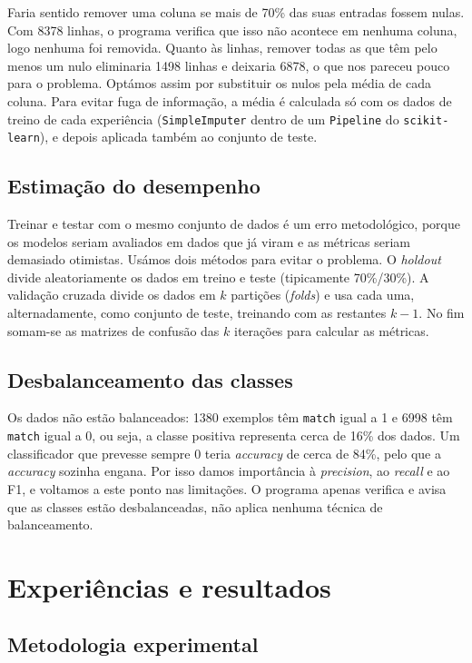 \documentclass[12pt,a4paper]{article}
\newcommand{\code}[1]{\texttt{#1}}
\begin{document}
Faria sentido remover uma coluna se mais de 70\% das suas entradas fossem nulas. Com 8378 linhas, o programa verifica que isso não acontece em nenhuma coluna, logo nenhuma foi removida. Quanto às linhas, remover todas as que têm pelo menos um nulo eliminaria 1498 linhas e deixaria 6878, o que nos pareceu pouco para o problema. Optámos assim por substituir os nulos pela média de cada coluna. Para evitar fuga de informação, a média é calculada só com os dados de treino de cada experiência (\code{SimpleImputer} dentro de um \code{Pipeline} do \code{scikit-learn}), e depois aplicada também ao conjunto de teste.

\subsection{Estimação do desempenho}

Treinar e testar com o mesmo conjunto de dados é um erro metodológico, porque os modelos seriam avaliados em dados que já viram e as métricas seriam demasiado otimistas. Usámos dois métodos para evitar o problema. O \emph{holdout} divide aleatoriamente os dados em treino e teste (tipicamente 70\%/30\%). A validação cruzada divide os dados em $k$ partições (\emph{folds}) e usa cada uma, alternadamente, como conjunto de teste, treinando com as restantes $k-1$. No fim somam-se as matrizes de confusão das $k$ iterações para calcular as métricas.

\subsection{Desbalanceamento das classes}

Os dados não estão balanceados: 1380 exemplos têm \code{match} igual a 1 e 6998 têm \code{match} igual a 0, ou seja, a classe positiva representa cerca de 16\% dos dados. Um classificador que prevesse sempre 0 teria \emph{accuracy} de cerca de 84\%, pelo que a \emph{accuracy} sozinha engana. Por isso damos importância à \emph{precision}, ao \emph{recall} e ao F1, e voltamos a este ponto nas limitações. O programa apenas verifica e avisa que as classes estão desbalanceadas, não aplica nenhuma técnica de balanceamento.

\clearpage
\section{Experiências e resultados}

\subsection{Metodologia experimental}
\end{document}
